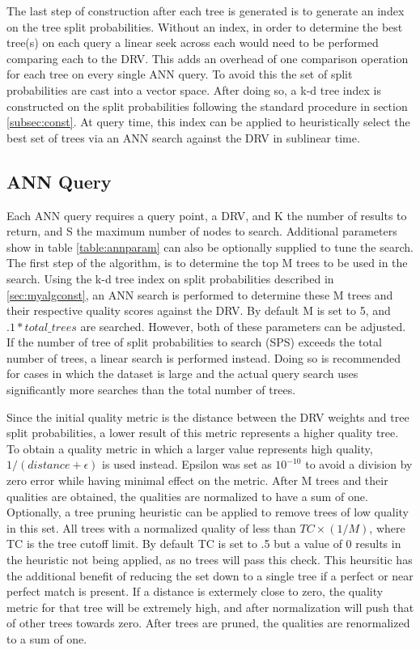 The last step of construction after each tree is generated is to generate an index on the tree split probabilities.  Without an index, in order to determine the best tree(s) on each query a linear seek across each would need to be performed comparing each to the DRV.  This adds an overhead of one comparison operation for each tree on every single ANN query.  To avoid this the set of split probabilities are cast into a vector space.  After doing so, a k-d tree index is constructed on the split probabilities following the standard procedure in section \ref{subsec:const}.  At query time, this index can be applied to heuristically select the best set of trees via an ANN search against the DRV in sublinear time.

\subsection{ANN Query}

Each ANN query requires a query point, a DRV, and K the number of results to return, and S the maximum number of nodes to search.  Additional parameters show in table \ref{table:annparam} can also be optionally supplied to tune the search.  The first step of the algorithm, is to determine the top M trees to be used in the search.  Using the k-d tree index on split probabilities described in \ref{sec:myalgconst}, an ANN search is performed to determine these M trees and their respective quality scores against the DRV.  By default M is set to 5, and $.1*{total\_trees}$ are searched.  However, both of these parameters can be adjusted.  If the number of tree of split probabilities to search (SPS) exceeds the total number of trees, a linear search is performed instead.  Doing so is recommended for cases in which the dataset is large and the actual query search uses significantly more searches than the total number of trees.

Since the initial quality metric is the distance between the DRV weights and tree split probabilities, a lower result of this metric represents a higher quality tree.  To obtain a quality metric in which a larger value represents high quality, $1/(distance + \epsilon)$ is used instead.  Epsilon was set as $10^{-10}$ to avoid a division by zero error while having minimal effect on the metric.  After M trees and their qualities are obtained, the qualities are normalized to have a sum of one.  Optionally, a tree pruning heuristic can be applied to remove trees of low quality in this set.  All trees with a normalized quality of less than $TC\times(1/M)$, where TC is the tree cutoff limit.  By default TC is set to .5 but a value of 0 results in the heuristic not being applied, as no trees will pass this check.  This heursitic has the additional benefit of reducing the set down to a single tree if a perfect or near perfect match is present.  If a distance is extermely close to zero, the quality metric for that tree will be extremely high, and after normalization will push that of other trees towards zero.  After trees are pruned, the qualities are renormalized to a sum of one.

